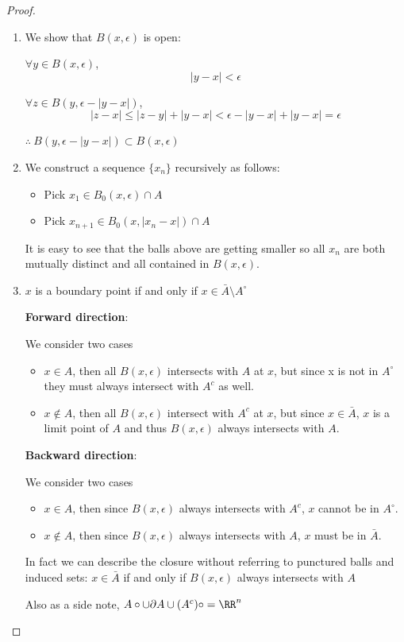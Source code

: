 \begin{proof} \
\begin{enumerate}
\item We show that $B(x,\epsilon)$ is open:

$\forall y \in B(x,\epsilon)$, 
\[ |y-x|<\epsilon \]

$\forall z \in B(y,\epsilon-|y-x|)$, 
\[ |z-x|\le|z-y|+|y-x|<\epsilon-|y-x|+|y-x|=\epsilon \]

$\therefore\:B(y,\epsilon-|y-x|) \subset B(x,\epsilon)$

\item We construct a sequence $\{x_n\}$ recursively as follows:
\begin{itemize}
\item Pick $x_1 \in B_0(x,\epsilon) \cap A$
\item Pick $x_{n+1} \in B_0(x,|x_n-x|) \cap A$
\end{itemize}
It is easy to see that the balls above are getting smaller so all $x_n$ are both mutually distinct and all contained in $B(x,\epsilon)$.

\item $x$ is a boundary point if and only if $x \in \bar{A} \setminus A^\circ$

\textbf{Forward direction}: 

We consider two cases
\begin{itemize}
\item $x \in A$, then all $B(x,\epsilon)$ intersects with $A$ at $x$, but since x is not in $A^\circ$ they must always intersect with $A^c$ as well.
\item $x \notin A$, then all $B(x,\epsilon)$ intersect with $A^c$ at $x$, but since $x \in \bar{A}$, $x$ is a limit point of $A$ and thus $B(x,\epsilon)$ always intersects with $A$.
\end{itemize}

\textbf{Backward direction}:

We consider two cases
\begin{itemize}
\item $x \in A$, then since $B(x,\epsilon)$ always intersects with $A^c$, $x$ cannot be in $A^\circ$.
\item $x \notin A$, then since $B(x,\epsilon)$ always intersects with $A$, $x$ must be in $\bar{A}$.
\end{itemize}

In fact we can describe the closure without referring to punctured balls and induced sets:
$x \in \bar{A}$ if and only if $B(x,\epsilon)$ always intersects with $A$

Also as a side note, $A\circ\cup \partial A\cup (A^c)\circ=\RR^n$
\end{enumerate}
\end{proof}

